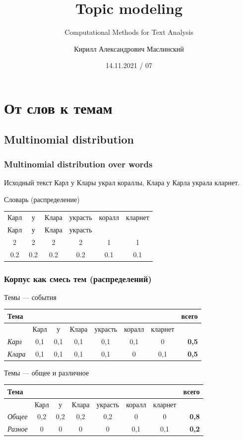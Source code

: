 \documentclass[10pt,svgnames]{beamer}
\title[CMTA 07] %
{Topic modeling}
\subtitle
{Computational Methods for Text Analysis} %
\author%
{Кирилл Александрович Маслинский}
\institute%
{НИУ ВШЭ Санкт-Петербург}
\date%
{14.11.2021 / 07}
\begin{document}
\begin{frame}
  \titlepage
\end{frame}

\section{От слов к темам}

\subsection{Multinomial distribution}

\begin{frame}
  \frametitle{Multinomial distribution over words}

  \begin{block}{Исходный текст}
    Карл у Клары украл кораллы, Клара у Карла украла кларнет.
  \end{block}
  
  \begin{block}{Словарь (распределение)}
    \begin{tabular}[c]{cccccc} 
      Карл&у&Клара&украсть&коралл&кларнет\\
      Карл&у&Клара&украсть&      &       \\ 
      2 & 2& 2 & 2& 1& 1\\
      0.2 & 0.2 & 0.2 & 0.2 & 0.1 & 0.1 \\
    \end{tabular}
  \end{block}
\end{frame}

\begin{frame}
  \frametitle{Корпус как смесь тем (распределений)}
  \footnotesize
  \begin{block}{Темы — события}
    \begin{tabular}[c]{lccccccr}
      Тема &&&&&&& всего \\
      \hline
      & Карл&у&Клара&украсть&коралл&кларнет&\\
     \textit{Карл}& 0,1 & 0,1 & 0,1 & 0,1 & 0,1 & \alert{0} & \textbf{0,5} \\
      \textit{Клара} & 0,1 & 0,1 & 0,1 & 0,1 & \alert{0} & 0,1 & \textbf{0,5}\\
    \end{tabular}
  \end{block}

  \begin{block}{Темы — общее и различное}
    \begin{tabular}[c]{lccccccr}
      Тема &&&&&&& всего \\
      \hline
      & Карл&у&Клара&украсть&коралл&кларнет&\\
     \textit{Общее} & 0,2 & 0,2 & 0,2 & 0,2 & 0 & 0 & \textbf{0,8}\\
      \textit{Разное} & 0 & 0 & 0 & 0 & 0,1 & 0,1 & \textbf{0,2}\\ 
    \end{tabular}
  \end{block}
\end{frame}
\end{document}
